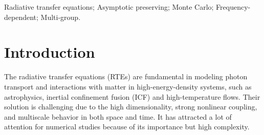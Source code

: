 \documentclass[preprint,12pt]{elsarticle}
\theoremstyle{definition}
\theoremstyle{plain}
\numberwithin{equation}{section}
\numberwithin{algorithm}{section}
\newcounter{eq_count}
\newcounter{thm_count}
\newcounter{fig_count}
\newcounter{tab_count}
\newcounter{alg_count}
\let\OldSection\section
\renewcommand{\section}{
    \setcounter{eq_count}{0}
    \setcounter{thm_count}{0}
    \setcounter{fig_count}{0}
    \setcounter{tab_count}{0}
    \setcounter{alg_count}{0}
    \OldSection
}
\begin{document}
\begin{frontmatter}
\begin{abstract}
            


    \end{abstract}

   
    \begin{keyword}
         Radiative transfer equations; Asymptotic preserving; Monte Carlo; Frequency-dependent; Multi-group.
    \end{keyword}

\end{frontmatter}


\section{Introduction}
\label{sec:introduction}
The radiative transfer equations (RTEs) are fundamental in modeling photon transport and interactions with matter in high-energy-density systems, such as astrophysics, inertial confinement fusion (ICF) and high-temperature flows. Their solution is challenging due to the high dimensionality, strong nonlinear coupling, and multiscale behavior in both space and time. It has attracted a lot of attention for numerical studies because of its importance but high complexity.
\end{document}
